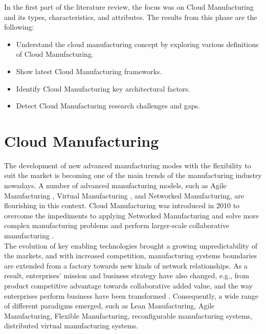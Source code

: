 In the first part of the literature review, the focus was on Cloud Manufacturing and its types, characteristics, and attributes. The results from this phase are the following:
\begin{itemize}
    \item Understand the cloud manufacturing concept by exploring various definitions of Cloud Manufacturing.
    \item Show latest Cloud Manufacturing frameworks.
    \item Identify Cloud Manufacturing key architectural factors.
    \item Detect Cloud Manufacturing research challenges and gaps.
\end{itemize}

\section{Cloud Manufacturing}
The development of new advanced manufacturing modes with the flexibility to suit the market is becoming one of the main trends of the manufacturing industry nowadays. A number of advanced manufacturing models, such as Agile Manufacturing \parencite{yy_yusuf_agile_1999}, Virtual Manufacturing \parencite{souza_virtual_2006}, and Networked Manufacturing, are flourishing in this context. Cloud Manufacturing was introduced in 2010 to overcome the impediments to applying Networked Manufacturing and solve more complex manufacturing problems and perform larger-scale collaborative manufacturing \parencite{bo-hu_cloud_2010}.\\
The evolution of key enabling technologies brought a growing unpredictability of the markets, and with increased competition, manufacturing systems boundaries are extended from a factory towards new kinds of network relationships. As a result, enterprises’ mission and business strategy have also changed, e.g., from product competitive advantage towards collaborative added value, and the way enterprises perform business have been transformed \parencite{chituc2009challenges}. Consequently, a wide range of different paradigms emerged, such as Lean Manufacturing, Agile Manufacturing, Flexible Manufacturing, reconfigurable manufacturing systems, distributed virtual manufacturing systems.\\
